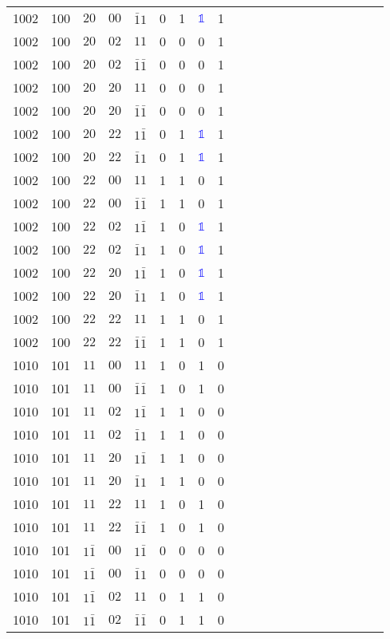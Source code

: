 \begin{longtable*}{c| cccccccccccccccccccc }
1002& 100& $20$& $00$& $\bar{1}1$& 0& 1& \textcolor{blue}{$\mathds{1}$}& 1\\
1002& 100& $20$& $02$& $11$& 0& 0& 0& 1\\
1002& 100& $20$& $02$& $\bar{1}\bar{1}$& 0& 0& 0& 1\\
1002& 100& $20$& $20$& $11$& 0& 0& 0& 1\\
1002& 100& $20$& $20$& $\bar{1}\bar{1}$& 0& 0& 0& 1\\
1002& 100& $20$& $22$& $1\bar{1}$& 0& 1& \textcolor{blue}{$\mathds{1}$}& 1\\
1002& 100& $20$& $22$& $\bar{1}1$& 0& 1& \textcolor{blue}{$\mathds{1}$}& 1\\
1002& 100& $22$& $00$& $11$& 1& 1& 0& 1\\
1002& 100& $22$& $00$& $\bar{1}\bar{1}$& 1& 1& 0& 1\\
1002& 100& $22$& $02$& $1\bar{1}$& 1& 0& \textcolor{blue}{$\mathds{1}$}& 1\\
1002& 100& $22$& $02$& $\bar{1}1$& 1& 0& \textcolor{blue}{$\mathds{1}$}& 1\\
1002& 100& $22$& $20$& $1\bar{1}$& 1& 0& \textcolor{blue}{$\mathds{1}$}& 1\\
1002& 100& $22$& $20$& $\bar{1}1$& 1& 0& \textcolor{blue}{$\mathds{1}$}& 1\\
1002& 100& $22$& $22$& $11$& 1& 1& 0& 1\\
1002& 100& $22$& $22$& $\bar{1}\bar{1}$& 1& 1& 0& 1\\
1010& 101& $11$& $00$& $11$& 1& 0& 1& 0\\
1010& 101& $11$& $00$& $\bar{1}\bar{1}$& 1& 0& 1& 0\\
1010& 101& $11$& $02$& $1\bar{1}$& 1& 1& 0& 0\\
1010& 101& $11$& $02$& $\bar{1}1$& 1& 1& 0& 0\\
1010& 101& $11$& $20$& $1\bar{1}$& 1& 1& 0& 0\\
1010& 101& $11$& $20$& $\bar{1}1$& 1& 1& 0& 0\\
1010& 101& $11$& $22$& $11$& 1& 0& 1& 0\\
1010& 101& $11$& $22$& $\bar{1}\bar{1}$& 1& 0& 1& 0\\
1010& 101& $1\bar{1}$& $00$& $1\bar{1}$& 0& 0& 0& 0\\
1010& 101& $1\bar{1}$& $00$& $\bar{1}1$& 0& 0& 0& 0\\
1010& 101& $1\bar{1}$& $02$& $11$& 0& 1& 1& 0\\
1010& 101& $1\bar{1}$& $02$& $\bar{1}\bar{1}$& 0& 1& 1& 0\\

\end{longtable*}

